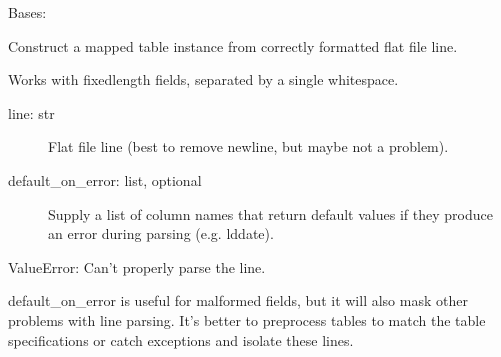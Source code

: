 \documentclass[letterpaper,10pt,english]{sphinxmanual}
\begin{document}
\begin{fulllineitems}
\label{\detokenize{infrapy.database:infrapy.database.schema.loc_params}}
Bases: 

\begin{fulllineitems}
\label{\detokenize{infrapy.database:infrapy.database.schema.loc_params.algorithm}}
\end{fulllineitems}


\begin{fulllineitems}
\label{\detokenize{infrapy.database:infrapy.database.schema.loc_params.from_string}}
Construct a mapped table instance from correctly formatted flat file line.

Works with fixed\sphinxhyphen{}length fields, separated by a single whitespace.
\begin{description}
\item[{line: str}] \leavevmode
Flat file line (best to remove newline, but maybe not a problem).

\item[{default\_on\_error: list, optional}] \leavevmode
Supply a list of column names that return default values if they
produce an error during parsing (e.g. lddate).

\end{description}

ValueError:  Can’t properly parse the line.

default\_on\_error is useful for malformed fields, but it will also mask
other problems with line parsing. It’s better to pre\sphinxhyphen{}process tables 
to match the table specifications or catch exceptions and isolate 
these lines.


\end{fulllineitems}
\end{fulllineitems}
\end{document}

